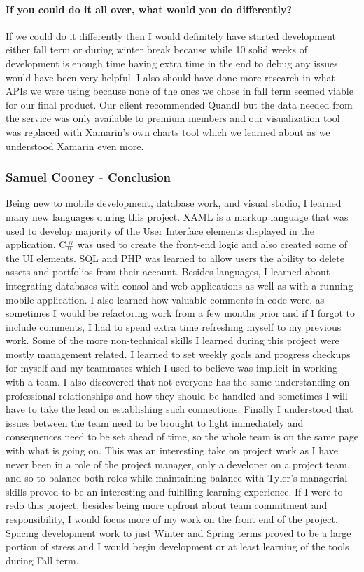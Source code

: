 \documentclass[onecolumn, draftclsnofoot,10pt, compsoc]{IEEEtran}
\begin{document}
\paragraph{If you could do it all over, what would you do differently?}
If we could do it differently then I would definitely have started development either fall term or during winter break because while 10 solid weeks of development is enough time having extra time in the end to debug any issues would have been very helpful. I also should have done more research in what APIs we were using because none of the ones we chose in fall term seemed viable for our final product. Our client recommended Quandl but the data needed from the service was only available to premium members and our visualization tool was replaced with Xamarin’s own charts tool which we learned about as we understood Xamarin even more. 

\subsubsection{Samuel Cooney - Conclusion}
Being new to mobile development, database work, and visual studio, I learned many new languages during this project. XAML is a markup language that was used to develop majority of the User Interface elements
displayed in  the application. C\# was used to create the front-end logic and also created some of the UI elements. SQL and PHP was learned to allow users the ability to delete assets and portfolios from their
account. Besides languages, I learned about integrating databases with consol and web applications as well as with a running mobile application.
I also learned how valuable comments in code were, as sometimes I would be refactoring work from a few months prior and if I forgot to include comments, I had to spend extra time refreshing myself to my previous work. 
Some of the more non-technical skills I learned during this project were mostly management related. I learned to set weekly goals and progress checkups for myself and my teammates which I used to 
believe was implicit in working with a team. I also discovered that not everyone has the same understanding on professional relationships and how they should be handled and sometimes
I will have to take the lead on establishing such connections. Finally I understood that issues between the team need to be brought to light immediately 
and consequences need to be set ahead of time, so the whole team is on  the same page with what is going on. This was an interesting take on project work as
I have never been in a role of the project manager, only a developer on a project team, and so to balance both roles while maintaining balance with Tyler's managerial skills
proved to be an interesting and fulfilling learning experience. If I were to redo this project, besides being more upfront about team commitment and responsibility, I would
focus more of my work on the front end of the project. Spacing development work to just Winter and Spring terms proved to be a large portion of stress and I would begin development
or at least learning of the tools during Fall term.
\end{document}
